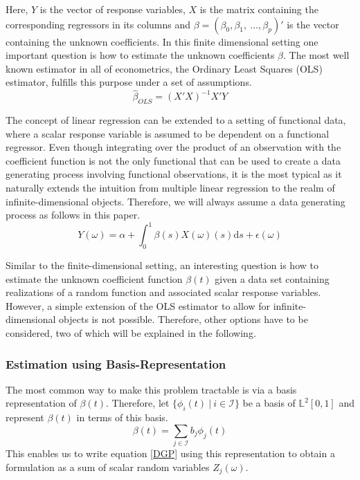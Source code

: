 \documentclass[11pt,twoside,a4paper]{article}
\begin{document}
	Here, $Y$ is the vector of response variables, $X$ is the matrix containing the corresponding regressors in its columns and $\beta = (\beta_0, \beta_1, \: \dots, \beta_p)'$ is the vector containing the unknown coefficients.
	In this finite dimensional setting one important question is how to estimate the unknown coefficients $\beta$. The most well known estimator in all of econometrics, the Ordinary Least Squares (OLS) estimator, fulfills this purpose under a set of assumptions.
	\begin{equation}
		\hat{\beta}_{OLS} = (X'X)^{-1}X'Y
	\end{equation}
	
	The concept of linear regression can be extended to a setting of functional data, where a scalar response variable is assumed to be dependent on a functional regressor. 
	Even though integrating over the product of an observation with the coefficient function is not the only functional that can be used to create a data generating process involving functional observations, it is the most typical as it naturally extends the intuition from multiple linear regression to the realm of infinite-dimensional objects. Therefore, we will always assume a data generating process as follows in this paper.
	\begin{equation}\label{DGP}
		Y(\omega) = \alpha + \int_{0}^{1} \beta(s)X(\omega)(s) \mathrm{d}s + \epsilon(\omega)
	\end{equation}
	
	Similar to the finite-dimensional setting, an interesting question is how to estimate the unknown coefficient function $\beta(t)$ given a data set containing realizations of a random function and associated scalar response variables. However, a simple extension of the OLS estimator to allow for infinite-dimensional objects is not possible. Therefore, other options have to be considered, two of which will be explained in the following.
	
	\subsubsection{Estimation using Basis-Representation}\label{basis_exp_transf}
	The most common way to make this problem tractable is via a basis representation of $\beta(t)$. Therefore, let $\{\phi_i(t) \: \vert \: i \in \mathcal{I}\}$ be a basis of $\mathbb{L}^2[0,1]$ and represent $\beta(t)$ in terms of this basis.
	\begin{equation}
		\beta(t) = \sum_{j \in \mathcal{I}} b_j \phi_j(t)
	\end{equation}
	This enables us to write equation \ref{DGP} using this representation to obtain a formulation as a sum of scalar random variables $Z_j(\omega)$.
	
\end{document}

